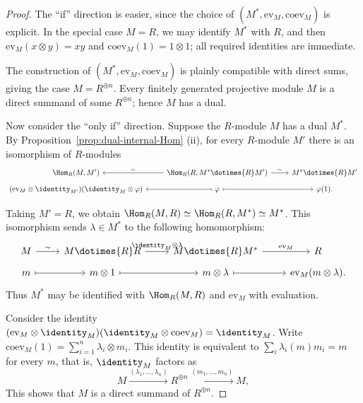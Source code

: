 \begin{proof}
	The ``if'' direction is easier, since the choice of
	$(M^*,\mathrm{ev}_M,\mathrm{coev}_M)$ is explicit. In the special case
	$M=R$, we may identify $M^*$ with $R$, and then
	$\mathrm{ev}_M(x\otimes y)=xy$ and $\mathrm{coev}_M(1)=1\otimes1$; all
	required identities are immediate.

	The construction of $(M^*,\mathrm{ev}_M,\mathrm{coev}_M)$ is plainly
compatible with direct sums, giving the case $M=R^{\oplus n}$. Every finitely
generated projective module $M$ is a direct summand of some $R^{\oplus n}$;
hence $M$ has a dual.

	Now consider the ``only if'' direction. Suppose the $R$-module $M$ has a
dual $M^*$. By Proposition~\ref{prop:dual-internal-Hom} (ii), for every
$R$-module $M'$ there is an isomorphism of $R$-modules
	\[\begin{tikzcd}[row sep=tiny]
		\Hom_R(M, M') & \Hom_R(R, M^* \dotimes{R} M') \arrow[l, "\sim"'] \arrow[r, "\sim"] & M^* \dotimes{R} M' \\
		(\mathrm{ev}_M \otimes \identity_{M'}) (\identity_M \otimes \varphi) & \varphi \arrow[mapsto, l] \arrow[mapsto, r] & \varphi(1).
	\end{tikzcd}\]

	Taking $M'=R$, we obtain
	$\Hom_R(M,R)\simeq\Hom_R(R,M^*)\simeq M^*$. This isomorphism sends
$\lambda\in M^*$ to the following homomorphism:
	\[\begin{tikzcd}[row sep=tiny]
		M \arrow[r, "\sim"] & M \dotimes{R} R \arrow[r, "{\identity_M \otimes \lambda}"] & M \dotimes{R} M^* \arrow[r, "{\mathrm{ev}_M}"] & R \\ 
		m \arrow[mapsto, r] & m \otimes 1 \arrow[mapsto, r] & m \otimes \lambda \arrow[mapsto, r] & \mathrm{ev}_M(m \otimes \lambda).
	\end{tikzcd}\]
	Thus $M^*$ may be identified with $\Hom_R(M,R)$ and $\mathrm{ev}_M$ with
evaluation.

	Consider the identity
	$(\mathrm{ev}_M\otimes\identity_M)
	(\identity_M\otimes\mathrm{coev}_M)=\identity_M$. Write
	$\mathrm{coev}_M(1)=\sum_{i=1}^n\lambda_i\otimes m_i$. This identity is
	equivalent to $\sum_i\lambda_i(m)m_i=m$ for every $m$, that is,
$\identity_M$ factors as
	\[ M \xrightarrow{(\lambda_1, \ldots, \lambda_n)} R^{\oplus n} \xrightarrow{(m_1, \ldots, m_n)} M, \]
	This shows that $M$ is a direct summand of $R^{\oplus n}$.
\end{proof}

